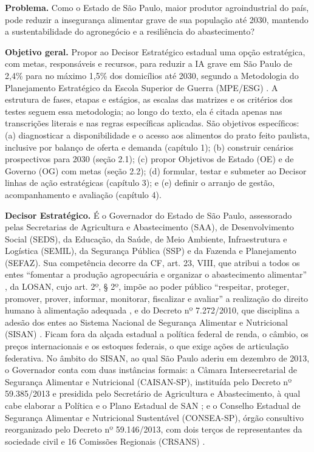 \documentclass[
	12pt,				%
	openright,			%
	oneside,			%
	a4paper,			%
	chapter=TITLE,		%
	section=TITLE,		%
	english,			%
	french,				%
	spanish,			%
	brazil,				%
 ]{abntex2}
\begin{document}
\textbf{Problema.} Como o Estado de São Paulo, maior produtor agroindustrial
do país, pode reduzir a insegurança alimentar grave de sua população até 2030,
mantendo a sustentabilidade do agronegócio e a resiliência do abastecimento?

\textbf{Objetivo geral.} Propor ao Decisor Estratégico estadual uma opção
estratégica, com metas, responsáveis e recursos, para reduzir a IA grave em
São Paulo de 2,4\% para no máximo 1,5\% dos domicílios até 2030, segundo a
Metodologia do Planejamento Estratégico da Escola Superior de Guerra (MPE/ESG)
\cite{esg_mpe2026,araujo_cenarios2026}. A estrutura de fases, etapas e
estágios, as escalas das matrizes e os critérios dos testes seguem essa
metodologia; ao longo do texto, ela é citada apenas nas transcrições literais e
nas regras específicas aplicadas. São objetivos específicos:
(a) diagnosticar a disponibilidade e o acesso aos alimentos do prato feito
paulista, inclusive por balanço de oferta e demanda (capítulo 1);
(b) construir cenários prospectivos para 2030 (seção 2.1);
(c) propor Objetivos de Estado (OE) e de Governo (OG) com metas (seção 2.2);
(d) formular, testar e submeter ao Decisor linhas de ação estratégicas
(capítulo 3); e (e) definir o arranjo de gestão, acompanhamento e avaliação
(capítulo 4).

\textbf{Decisor Estratégico.} É o Governador do Estado de São Paulo,
assessorado pelas Secretarias de Agricultura e Abastecimento (SAA), de
Desenvolvimento Social (SEDS), da Educação, da Saúde, de Meio Ambiente,
Infraestrutura e Logística (SEMIL), da Segurança Pública (SSP) e da Fazenda e
Planejamento (SEFAZ). Sua competência decorre da CF, art. 23, VIII, que atribui
a todos os entes ``fomentar a produção agropecuária e organizar o abastecimento
alimentar'' \cite{brasil1988}, da LOSAN, cujo art. 2º, § 2º, impõe ao poder
público ``respeitar, proteger, promover, prover, informar, monitorar,
fiscalizar e avaliar'' a realização do direito humano à alimentação adequada
\cite{brasil2006b}, e do Decreto nº 7.272/2010, que disciplina a adesão dos
entes ao Sistema Nacional de Segurança Alimentar e Nutricional (SISAN)
\cite{brasil2010sisan}. Ficam fora da alçada estadual a política federal de
renda, o câmbio, os preços internacionais e os estoques federais, o que exige
ações de articulação federativa. No âmbito do SISAN, ao qual São Paulo aderiu
em dezembro de 2013, o Governador conta com duas instâncias formais: a Câmara
Intersecretarial de Segurança Alimentar e Nutricional (CAISAN-SP), instituída
pelo Decreto nº 59.385/2013 e presidida pelo Secretário de Agricultura e
Abastecimento, à qual cabe elaborar a Política e o Plano Estadual de SAN
\cite{saopaulo2013caisan}; e o Conselho Estadual de Segurança Alimentar e
Nutricional Sustentável (CONSEA-SP), órgão consultivo reorganizado pelo Decreto
nº 59.146/2013, com dois terços de representantes da sociedade civil e 16
Comissões Regionais (CRSANS) \cite{saopaulo2013consea}.
\end{document}
